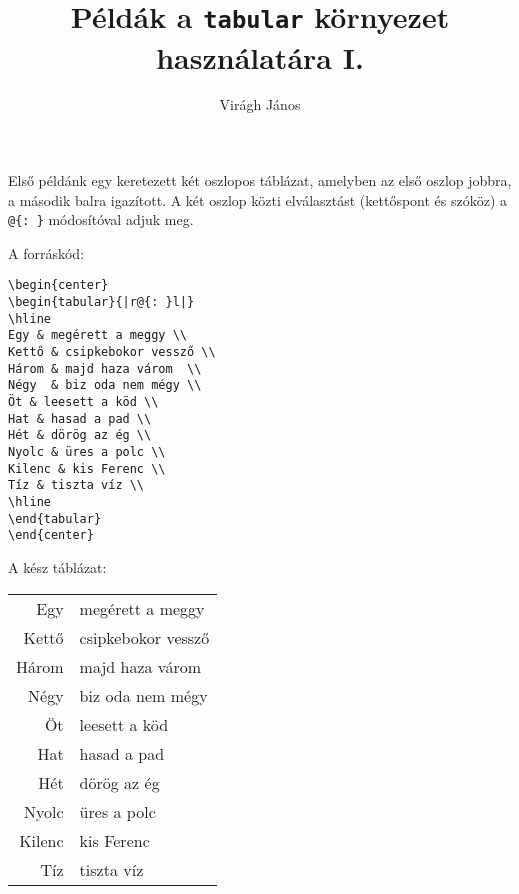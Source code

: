 \documentclass[a4paper]{article}
\author{Virágh János}
\title{Példák a \texttt{tabular} környezet használatára I.}
\begin{document}
\maketitle	

Első példánk egy keretezett két oszlopos táblázat, amelyben az első oszlop jobbra, a második balra igazított. A két oszlop közti elválasztást (kettőspont és szóköz) a \verb!@{: }! módosítóval adjuk meg.

A forráskód:

\begin{verbatim}
\begin{center}
\begin{tabular}{|r@{: }l|}
\hline
Egy & megérett a meggy \\
Kettő & csipkebokor vessző \\
Három & majd haza várom  \\
Négy  & biz oda nem mégy \\
Öt & leesett a köd \\
Hat & hasad a pad \\
Hét & dörög az ég \\
Nyolc & üres a polc \\
Kilenc & kis Ferenc \\
Tíz & tiszta víz \\
\hline
\end{tabular}
\end{center}
\end{verbatim}

A kész táblázat:

\begin{center}
	\begin{tabular}{|r@{: }l|}
		\hline
		Egy & megérett a meggy \\
		Kettő & csipkebokor vessző \\
		Három & majd haza várom  \\
		Négy  & biz oda nem mégy \\
		Öt & leesett a köd \\
		Hat & hasad a pad \\
		Hét & dörög az ég \\
		Nyolc & üres a polc \\
		Kilenc & kis Ferenc \\
		Tíz & tiszta víz \\
		\hline
	\end{tabular}
\end{center}

\pagebreak[4]
\end{document}
